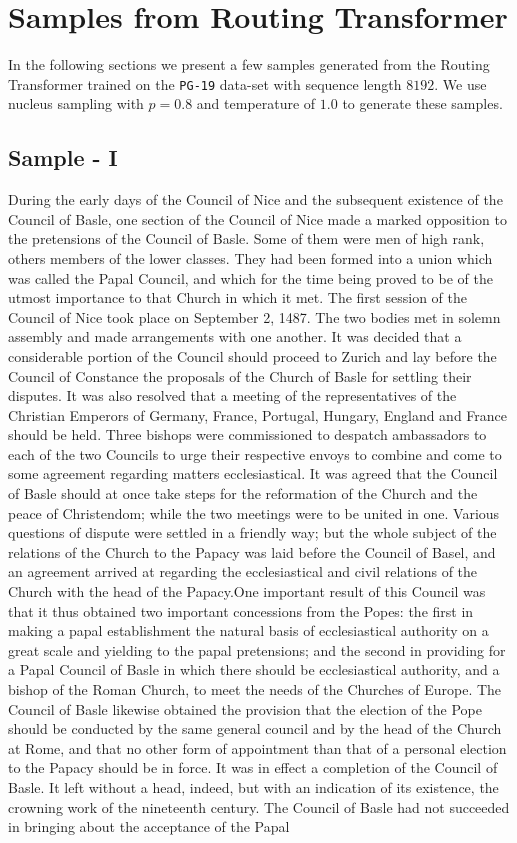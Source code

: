 \documentclass[a4paper]{article}
\begin{document}
\section{Samples from Routing Transformer}\label{sec:sample}
In the following sections we present a few samples generated from the Routing Transformer trained
on the \texttt{PG-19} data-set with sequence length \(8192\). We use nucleus sampling
\citep{Holtzman2020The} with \(p = 0.8\) and temperature of \(1.0\) to generate these samples. 

\subsection{Sample - I}
During the early days of the Council of Nice and the subsequent existence of the Council of Basle, one section of the Council of Nice made a marked opposition to the pretensions of the Council of Basle. Some of them were men of high rank, others members of the lower classes. They had been formed into a union which was called the Papal Council, and which for the time being proved to be of the utmost importance to that Church in which it met. The first session of the Council of Nice took place on September 2, 1487. The two bodies met in solemn assembly and made arrangements with one another. It was decided that a considerable portion of the Council should proceed to Zurich and lay before the Council of Constance the proposals of the Church of Basle for settling their disputes. It was also resolved that a meeting of the representatives of the Christian Emperors of Germany, France, Portugal, Hungary, England and France should be held. Three bishops were commissioned to despatch ambassadors to each of the two Councils to urge their respective envoys to combine and come to some agreement regarding matters ecclesiastical. It was agreed that the Council of Basle should at once take steps for the reformation of the Church and the peace of Christendom; while the two meetings were to be united in one. Various questions of dispute were settled in a friendly way; but the whole subject of the relations of the Church to the Papacy was laid before the Council of Basel, and an agreement arrived at regarding the ecclesiastical and civil relations of the Church with the head of the Papacy.One important result of this Council was that it thus obtained two important concessions from the Popes: the first in making a papal establishment the natural basis of ecclesiastical authority on a great scale and yielding to the papal pretensions; and the second in providing for a Papal Council of Basle in which there should be ecclesiastical authority, and a bishop of the Roman Church, to meet the needs of the Churches of Europe. The Council of Basle likewise obtained the provision that the election of the Pope should be conducted by the same general council and by the head of the Church at Rome, and that no other form of appointment than that of a personal election to the Papacy should be in force. It was in effect a completion of the Council of Basle. It left without a head, indeed, but with an indication of its existence, the crowning work of the nineteenth century. The Council of Basle had not succeeded in bringing about the acceptance of the Papal 
\end{document}
